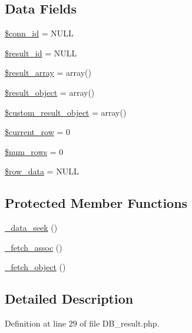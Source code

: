 \subsection*{Data Fields}
\begin{DoxyCompactItemize}
\item 
\hyperlink{class_c_i___d_b__result_a16c23f1dcbfed2f2759f5e54f604106d}{\$conn\-\_\-id} = N\-U\-L\-L
\item 
\hyperlink{class_c_i___d_b__result_a0ebacb40e3b6f8bf33d3de0f2cc71474}{\$result\-\_\-id} = N\-U\-L\-L
\item 
\hyperlink{class_c_i___d_b__result_a153392b3ec395131d32c70cda855698e}{\$result\-\_\-array} = array()
\item 
\hyperlink{class_c_i___d_b__result_aa292cbb3dbb8c654cb4f6c61f250efd3}{\$result\-\_\-object} = array()
\item 
\hyperlink{class_c_i___d_b__result_a680c2e11eeb189d9bb8ba2a552766b7b}{\$custom\-\_\-result\-\_\-object} = array()
\item 
\hyperlink{class_c_i___d_b__result_a2ec3a266ee95cda75cdbb71bc9ee1b53}{\$current\-\_\-row} = 0
\item 
\hyperlink{class_c_i___d_b__result_ac926549b713e71c5f5fd63999cebfb8c}{\$num\-\_\-rows} = 0
\item 
\hyperlink{class_c_i___d_b__result_a335b4c27a1529df9e484e044e470ec07}{\$row\-\_\-data} = N\-U\-L\-L
\end{DoxyCompactItemize}
\subsection*{Protected Member Functions}
\begin{DoxyCompactItemize}
\item 
\hyperlink{class_c_i___d_b__result_aa673adfa89de7d7b21c1f87624496f37}{\-\_\-data\-\_\-seek} ()
\item 
\hyperlink{class_c_i___d_b__result_a43a9a92817f1334a1c10752ec44275a0}{\-\_\-fetch\-\_\-assoc} ()
\item 
\hyperlink{class_c_i___d_b__result_a236bae79bb43606aa86598719b281c1f}{\-\_\-fetch\-\_\-object} ()
\end{DoxyCompactItemize}


\subsection{Detailed Description}


Definition at line 29 of file D\-B\-\_\-result.\-php.



